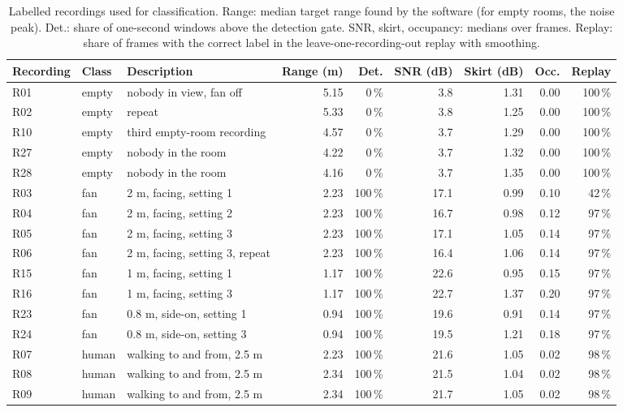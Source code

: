 \documentclass[11pt,a4paper]{article}
\begin{document}
\begin{table}[H]
\centering\scriptsize
\caption{Labelled recordings used for classification. Range: median target range found by the software (for empty rooms, the noise peak). Det.: share of one-second windows above the detection gate. SNR, skirt, occupancy: medians over frames. Replay: share of frames with the correct label in the leave-one-recording-out replay with smoothing.}
\label{tab:data}
\begin{tabular}{@{}lllrrrrrr@{}}
\toprule
Recording & Class & Description & Range (m) & Det. & SNR (dB) & Skirt (dB) & Occ. & Replay\\
\midrule
R01 & empty & nobody in view, fan off & 5.15 & 0\,\% & 3.8 & 1.31 & 0.00 & 100\,\% \\
R02 & empty & repeat & 5.33 & 0\,\% & 3.8 & 1.25 & 0.00 & 100\,\% \\
R10 & empty & third empty-room recording & 4.57 & 0\,\% & 3.7 & 1.29 & 0.00 & 100\,\% \\
R27 & empty & nobody in the room & 4.22 & 0\,\% & 3.7 & 1.32 & 0.00 & 100\,\% \\
R28 & empty & nobody in the room & 4.16 & 0\,\% & 3.7 & 1.35 & 0.00 & 100\,\% \\
R03 & fan & 2 m, facing, setting 1 & 2.23 & 100\,\% & 17.1 & 0.99 & 0.10 & 42\,\% \\
R04 & fan & 2 m, facing, setting 2 & 2.23 & 100\,\% & 16.7 & 0.98 & 0.12 & 97\,\% \\
R05 & fan & 2 m, facing, setting 3 & 2.23 & 100\,\% & 17.1 & 1.05 & 0.14 & 97\,\% \\
R06 & fan & 2 m, facing, setting 3, repeat & 2.23 & 100\,\% & 16.4 & 1.06 & 0.14 & 97\,\% \\
R15 & fan & 1 m, facing, setting 1 & 1.17 & 100\,\% & 22.6 & 0.95 & 0.15 & 97\,\% \\
R16 & fan & 1 m, facing, setting 3 & 1.17 & 100\,\% & 22.7 & 1.37 & 0.20 & 97\,\% \\
R23 & fan & 0.8 m, side-on, setting 1 & 0.94 & 100\,\% & 19.6 & 0.91 & 0.14 & 97\,\% \\
R24 & fan & 0.8 m, side-on, setting 3 & 0.94 & 100\,\% & 19.5 & 1.21 & 0.18 & 97\,\% \\
R07 & human & walking to and from, 2.5 m & 2.23 & 100\,\% & 21.6 & 1.05 & 0.02 & 98\,\% \\
R08 & human & walking to and from, 2.5 m & 2.34 & 100\,\% & 21.5 & 1.04 & 0.02 & 98\,\% \\
R09 & human & walking to and from, 2.5 m & 2.34 & 100\,\% & 21.7 & 1.05 & 0.02 & 98\,\% \\

\end{tabular}
\end{table}
\end{document}
